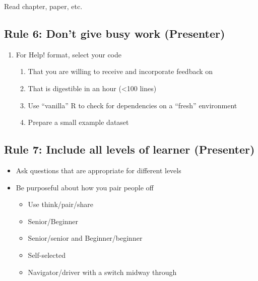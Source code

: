 \documentclass[
  11pt,
]{article}
\providecommand{\tightlist}{%
  \setlength{\itemsep}{0pt}\setlength{\parskip}{0pt}}
\begin{document}
Read chapter, paper, etc.

\hypertarget{rule-6-dont-give-busy-work-presenter}{%
\subsection{Rule 6: Don't give busy work
(Presenter)}\label{rule-6-dont-give-busy-work-presenter}}

\begin{enumerate}
\def\labelenumi{\arabic{enumi}.}
\setcounter{enumi}{1}
\tightlist
\item
  For Help! format, select your code

  \begin{enumerate}
  \def\labelenumii{\alph{enumii}.}
  \tightlist
  \item
    That you are willing to receive and incorporate feedback on
  \item
    That is digestible in an hour (\textless100 lines)
  \item
    Use ``vanilla'' R to check for dependencies on a ``fresh''
    environment
  \item
    Prepare a small example dataset
  \end{enumerate}
\end{enumerate}

\hypertarget{rule-7-include-all-levels-of-learner-presenter}{%
\subsection{Rule 7: Include all levels of learner
(Presenter)}\label{rule-7-include-all-levels-of-learner-presenter}}

\begin{itemize}
\tightlist
\item
  Ask questions that are appropriate for different levels
\item
  Be purposeful about how you pair people off

  \begin{itemize}
  \tightlist
  \item
    Use think/pair/share
  \item
    Senior/Beginner
  \item
    Senior/senior and Beginner/beginner
  \item
    Self-selected
  \item
    Navigator/driver with a switch midway through
  \end{itemize}
\end{itemize}
\end{document}
